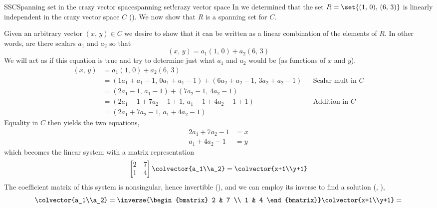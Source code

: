 \begin{example}{SSC}{Spanning set in the crazy vector space}{spanning set!crazy vector space}
In  we determined that the set $R=\set{(1,\,0),\,(6,\,3)}$ is linearly independent in the crazy vector space $C$ ().  We now show that $R$ is a spanning set for $C$.\par
%
Given an arbitrary vector $(x,\,y)\in C$ we desire to show that it can be written as a linear combination of the elements of $R$.  In other words, are there scalars $a_1$ and $a_2$ so that
%
\begin{equation*}
(x,\,y)=a_1(1,\,0) + a_2(6,\,3)
\end{equation*}
%
We will act as if this equation is true and try to determine just what $a_1$ and $a_2$ would be (as functions of $x$ and $y$).
%
\begin{align*}
(x,\,y)&=a_1(1,\,0) + a_2(6,\,3)\\
&= (1a_1+a_1-1,\,0a_1+a_1-1) + (6a_2+a_2-1,\,3a_2+a_2-1)
&&\text{Scalar mult in $C$}\\
%
&= (2a_1-1,\,a_1-1) + (7a_2-1,\,4a_2-1)\\
%
&= (2a_1-1+7a_2-1+1,\,a_1-1+4a_2-1+1)
&&\text{Addition in $C$}\\
%
&= (2a_1+7a_2-1,\,a_1+4a_2-1)
\end{align*}
%
Equality in $C$ then yields the two equations,
%
\begin{align*}
2a_1+7a_2-1&=x\\
a_1+4a_2-1&=y
\end{align*}
%
which becomes the linear system with a matrix representation
%
\begin{equation*}
\begin{bmatrix}
2 & 7 \\ 1 & 4
\end{bmatrix}
\colvector{a_1\\a_2}
=
\colvector{x+1\\y+1}
\end{equation*}
%
The coefficient matrix of this system is nonsingular, hence invertible (), and we can employ its inverse to find a solution (, ),
%
\begin{equation*}
\colvector{a_1\\a_2}=
\inverse{\begin{bmatrix} 2 & 7 \\ 1 & 4 \end{bmatrix}}\colvector{x+1\\y+1}=

\end{equation*}
\end{example}
